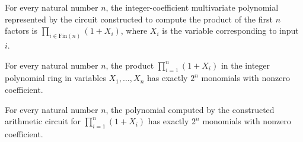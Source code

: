 \begin{theorem}
\label{Randomized.AlgCircuit.toMvPolynomial_prodOnePlus}
\leanok
{}
For every natural number $n$, the integer-coefficient multivariate polynomial
represented by the circuit constructed to compute the product of the first $n$ factors
is $\prod_{i\in\mathrm{Fin}(n)}(1+X_i)$, where $X_i$ is the variable corresponding to
input $i$.
\end{theorem}

\begin{theorem}
\label{Randomized.AlgCircuit.card_support_prod_one_add_X}
\leanok
{}
For every natural number $n$, the product $\prod_{i=1}^{n}(1+X_i)$ in the integer
polynomial ring in variables $X_1,\ldots,X_n$ has exactly $2^n$ monomials with nonzero
coefficient.
\end{theorem}

\begin{theorem}
\label{Randomized.AlgCircuit.card_support_toMvPolynomial_prodOnePlus}
\leanok
{}
For every natural number $n$, the polynomial computed by the constructed arithmetic
circuit for $\prod_{i=1}^{n}(1+X_i)$ has exactly $2^n$ monomials with nonzero
coefficient.
\end{theorem}
